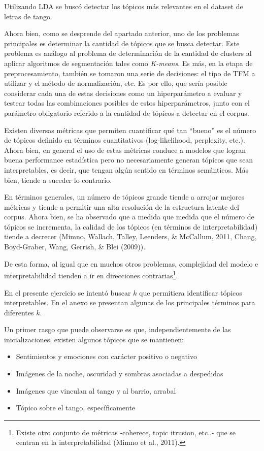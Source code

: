 \documentclass[]{article}
\providecommand{\tightlist}{%
  \setlength{\itemsep}{0pt}\setlength{\parskip}{0pt}}
\let\rmarkdownfootnote\footnote%
\def\footnote{\protect\rmarkdownfootnote}
\begin{document}
Utilizando LDA se buscó detectar los tópicos más relevantes en el
dataset de letras de tango.

Ahora bien, como se desprende del apartado anterior, uno de los
problemas principales es determinar la cantidad de tópicos que se busca
detectar. Este problema es análogo al problema de determinación de la
cantidad de clusters al aplicar algoritmos de segmentación tales como
\emph{K-means}. Es más, en la etapa de preprocesamiento, también se
tomaron una serie de decisiones: el tipo de TFM a utilizar y el método
de normalización, etc. Es por ello, que sería posible considerar cada
una de estas decisiones como un hiperparámetro a evaluar y testear todas
las combinaciones posibles de estos hiperparámetros, junto con el
parámetro obligatorio referido a la cantidad de tópicos a detectar en el
corpus.

Existen diversas métricas que permiten cuantificar qué tan ``bueno'' es
el número de tópicos definido en términos cuantitativos (log-likelihood,
perplexity, etc.). Ahora bien, en general el uso de estas métricas
conduce a modelos que logran buena performance estadística pero no
necesariamente generan tópicos que sean interpretables, es decir, que
tengan algún sentido en términos semánticos. Más bien, tiende a suceder
lo contrario.

En términos generales, un número de tópicos grande tiende a arrojar
mejores métricas y tiende a permitir una alta resolución de la
estructura latente del corpus. Ahora bien, se ha observado que a medida
que medida que el número de tópicos se incrementa, la calidad de los
tópicos (en términos de interpretabilidad) tiende a decrecer (Mimno,
Wallach, Talley, Leenders, \& McCallum, 2011, Chang, Boyd-Graber, Wang,
Gerrish, \& Blei (2009)).

De esta forma, al igual que en muchos otros problemas, complejidad del
modelo e interpretabilidad tienden a ir en direcciones
contrarias\footnote{Existe otro conjunto de métricas -coherece, topic
  itrusion, etc..- que se centran en la interpretabilidad (Mimno et al.,
  2011).}.

En el presente ejercicio se intentó buscar \(k\) que permitiera
identificar tópicos interpretables. En el anexo se presentan algunas de
los principales términos para diferentes \(k\).

Un primer rasgo que puede observarse es que, independientemente de las
inicializaciones, existen algunos tópicos que se mantienen:

\begin{itemize}
\tightlist
\item
  Sentimientos y emociones con carácter positivo o negativo
\item
  Imágenes de la noche, oscuridad y sombras asociadas a despedidas
\item
  Imágenes que vinculan al tango y al barrio, arrabal
\item
  Tópico sobre el tango, específicamente
\end{itemize}
\end{document}

